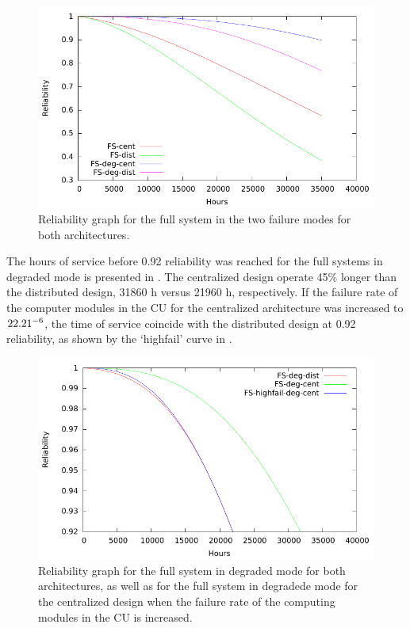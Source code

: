 \begin{figure}[H]
  \centering
  \includegraphics{plots/FS.pdf}
  \caption{Reliability graph for the full system in the two failure modes for both architectures.}
  \label{fig:fs}
\end{figure}

The hours of service before 0.92 reliability was reached for the full systems in degraded mode is presented in . The centralized design operate 45\% longer than the distributed design, 31860  h versus 21960 h, respectively. If the failure rate of the computer modules in the CU for the centralized architecture was increased to $22.21 \time 10^{-6}$, the time of service coincide with the distributed design at 0.92 reliability, as shown by the `highfail' curve in . 
\begin{figure}[H]
  \centering
  \includegraphics{plots/3b.pdf}
  \caption{Reliability graph for the full system in degraded mode for both architectures, as well as for the full system in degradede mode for the centralized design when the failure rate of the computing modules in the CU is increased.}
  \label{fig:cfs_hf}
\end{figure}
